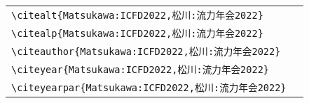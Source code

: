 \begin{table}[t]
\begin{tabular}{ll}
        \verb|\citealt{Matsukawa:ICFD2022,松川:流力年会2022}|         &\citealt{Matsukawa:ICFD2022,松川:流力年会2022} \\
        \verb|\citealp{Matsukawa:ICFD2022,松川:流力年会2022}|         &\citealp{Matsukawa:ICFD2022,松川:流力年会2022} \\
        \verb|\citeauthor{Matsukawa:ICFD2022,松川:流力年会2022}|      &\citeauthor{Matsukawa:ICFD2022,松川:流力年会2022} \\
        \verb|\citeyear{Matsukawa:ICFD2022,松川:流力年会2022}|        &\citeyear{Matsukawa:ICFD2022,松川:流力年会2022} \\
        \verb|\citeyearpar{Matsukawa:ICFD2022,松川:流力年会2022}|     &\citeyearpar{Matsukawa:ICFD2022,松川:流力年会2022}
    \end{tabular}
\end{table}
